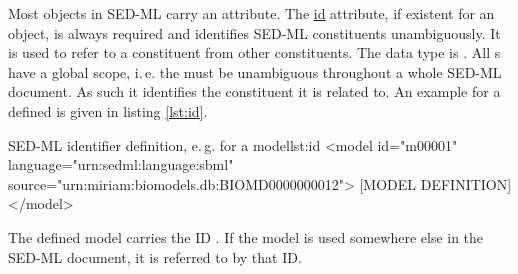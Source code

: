 \label{sec:id}
%

Most objects in SED-ML carry an  attribute. 
The \hyperref[sec:id]{id} attribute, if existent for an object, is always required and identifies SED-ML constituents unambiguously.  
It is used to refer to a constituent from other constituents. 
The  data type is . All s have a global scope, i.\,e. the  must be unambiguous throughout a whole SED-ML document. As such it identifies the constituent it is related to.
An example for a defined  is given in listing \ref{lst:id}.
%
\begin{myXmlLst}{SED-ML identifier definition, e.\,g. for a model}{lst:id}
<model id="m00001" language="urn:sedml:language:sbml" source="urn:miriam:biomodels.db:BIOMD0000000012">
 [MODEL DEFINITION]
</model>
\end{myXmlLst}
%
The defined model carries the ID . If the model is used somewhere else in the SED-ML document, it is referred to by that ID.

